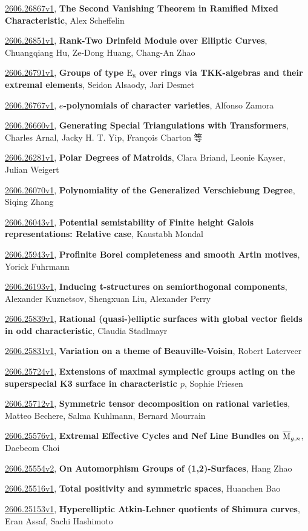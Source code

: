 \documentclass[9pt, a4paper]{article}
\theoremstyle{plain}
\theoremstyle{definition}
\theoremstyle{remark}
\newcommand{\arxiv}[3]{\href{https://arxiv.org/abs/#1}{#1}, \textbf{\textcolor{arxivblue}{#2}}, #3}
\begin{document}
\arxiv{2606.26867v1}{The Second Vanishing Theorem in Ramified Mixed Characteristic}{Alex Scheffelin}

\arxiv{2606.26851v1}{Rank-Two Drinfeld Module over Elliptic Curves}{Chuangqiang Hu, Ze-Dong Huang, Chang-An Zhao}

\arxiv{2606.26791v1}{Groups of type $\mathrm{E}_8$ over rings via TKK-algebras and their extremal elements}{Seidon Alsaody, Jari Desmet}

\arxiv{2606.26767v1}{$e$-polynomials of character varieties}{Alfonso Zamora}

\arxiv{2606.26660v1}{Generating Special Triangulations with Transformers}{Charles Arnal, Jacky H. T. Yip, François Charton 等}

\arxiv{2606.26281v1}{Polar Degrees of Matroids}{Clara Briand, Leonie Kayser, Julian Weigert}

\arxiv{2606.26070v1}{Polynomiality of the Generalized Verschiebung Degree}{Siqing Zhang}

\arxiv{2606.26043v1}{Potential semistability of Finite height Galois representations: Relative case}{Kaustabh Mondal}

\arxiv{2606.25943v1}{Profinite Borel completeness and smooth Artin motives}{Yorick Fuhrmann}

\arxiv{2606.26193v1}{Inducing t-structures on semiorthogonal components}{Alexander Kuznetsov, Shengxuan Liu, Alexander Perry}

\arxiv{2606.25839v1}{Rational (quasi-)elliptic surfaces with global vector fields in odd characteristic}{Claudia Stadlmayr}

\arxiv{2606.25831v1}{Variation on a theme of Beauville-Voisin}{Robert Laterveer}

\arxiv{2606.25724v1}{Extensions of maximal symplectic groups acting on the superspecial K3 surface in characteristic $p$}{Sophie Friesen}

\arxiv{2606.25712v1}{Symmetric tensor decomposition on rational varieties}{Matteo Bechere, Salma Kuhlmann, Bernard Mourrain}

\arxiv{2606.25576v1}{Extremal Effective Cycles and Nef Line Bundles on \(\overline{\rm{M}}_{g,n}\)}{Daebeom Choi}

\arxiv{2606.25554v2}{On Automorphism Groups of (1,2)-Surfaces}{Hang Zhao}

\arxiv{2606.25516v1}{Total positivity and symmetric spaces}{Huanchen Bao}

\arxiv{2606.25153v1}{Hyperelliptic Atkin-Lehner quotients of Shimura curves}{Eran Assaf, Sachi Hashimoto}
\end{document}
